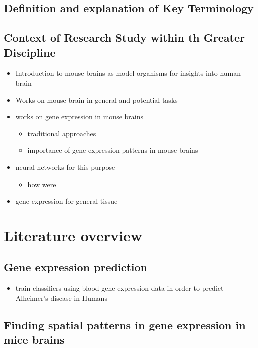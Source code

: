 \documentclass[]{article}
\renewcommand{\cite}{\citep}
\begin{document}
\subsection*{Definition and explanation of Key Terminology}

\subsection*{Context of Research Study within th Greater Discipline}

\begin{itemize}
	\item Introduction to mouse brains as model organisms for insights into human brain
	\item Works on mouse brain in general and potential tasks
	\item works on gene expression in mouse brains
	\begin{itemize}
		\item traditional approaches
		\item importance of gene expression patterns in mouse brains
	\end{itemize}
	\item neural networks for this purpose
	\begin{itemize}
		\item how were 
	\end{itemize}
	\item gene expression for general tissue
	
\end{itemize}

\newpage
\section{Literature overview}
\label{sec:relatedwork}
\subsection{Gene expression prediction}

\begin{itemize}

	\item \cite{lee2020prediction} train classifiers using blood gene expression data in order to predict Alheimer's disease in Humans

	
\end{itemize}

\subsection{Finding spatial patterns in gene expression in mice brains}
\end{document}
